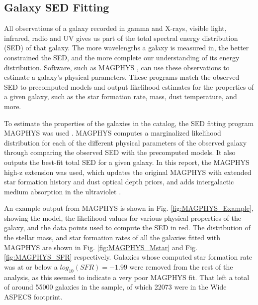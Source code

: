 


\subsection{Galaxy SED Fitting}

All observations of a galaxy recorded in gamma and X-rays, visible light, infrared, radio and UV gives us part of the total spectral energy distribution (SED) of that galaxy. The more wavelengths a galaxy is measured in, the better constrained the SED, and the more complete our understanding of its energy distribution. Software, such as MAGPHYS \cite{da2008simple, da2015alma}, can use these observations to estimate a galaxy's physical parameters. These programs match the observed SED to precomputed models and output likelihood estimates for the properties of a given galaxy, such as the star formation rate, mass, dust temperature, and more.



To estimate the properties of the galaxies in the catalog, the SED fitting program MAGPHYS was used \cite{da2008simple, da2015alma}. MAGPHYS computes a marginalized likelihood distribution for each of the different physical parameters of the observed galaxy through comparing the observed SED with the precomputed models. It also outputs the best-fit total SED for a given galaxy. In this report, the MAGPHYS high-z extension was used, which updates the original MAGPHYS with extended star formation history and dust optical depth priors, and adds intergalactic medium absorption in the ultraviolet \cite{da2015alma}.

An example output from MAGPHYS is shown in Fig. \ref{fig:MAGPHYS_Example}, showing the model, the likelihood values for various physical properties of the galaxy, and the data points used to compute the SED in red. The distribution of the stellar mass, and star formation rates of all the galaxies fitted with MAGPHYS are shown in Fig. \ref{fig:MAGPHYS_Mstar} and Fig. \ref{fig:MAGPHYS_SFR} respectively. Galaxies whose computed star formation rate was at or below a $log_{10}(SFR) = -1.99$ were removed from the rest of the analysis, as this seemed to indicate a very poor MAGPHYS fit. That left a total of around 55000 galaxies in the sample, of which 22073 were in the Wide ASPECS footprint.

